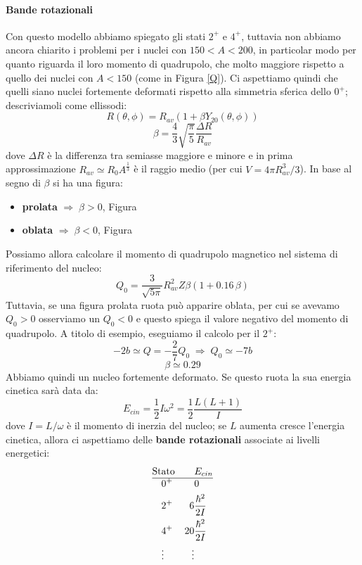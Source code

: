 \paragraph{Bande rotazionali} Con questo modello abbiamo spiegato gli stati $2^+$ e $4^+$, tuttavia non abbiamo ancora chiarito i problemi per i nuclei con $150<A<200$, in particolar modo per quanto riguarda il loro momento di quadrupolo, che molto maggiore rispetto a quello dei nuclei con $A<150$ (come in Figura \ref{Q}). Ci aspettiamo quindi che quelli siano nuclei fortemente deformati rispetto alla simmetria sferica dello $0^+$; descriviamoli come ellissodi:
$$R(\theta,\phi) = R_{av}(1+\beta Y_{20}(\theta,\phi))$$
$$\beta = \frac{4}{3}\sqrt{\frac{\pi}{5}} \frac{\Delta R}{R_{av}}$$
dove $\Delta R$ è la differenza tra semiasse maggiore e minore e in prima approssimazione $R_{av}\simeq R_0 A^{\frac{1}{3}}$ è il raggio medio (per cui $V=4\pi R_{av}^3/3$). In base al segno di $\beta$ si ha una figura:
\begin{itemize}
    \item \textbf{prolata} $\Rightarrow \; \beta >0$, Figura
    \item \textbf{oblata} $\Rightarrow \; \beta <0$, Figura
\end{itemize}
Possiamo allora calcolare il momento di quadrupolo magnetico nel sistema di riferimento del nucleo:
$$Q_0 = \frac{3}{\sqrt{5\pi}}R^2_{av}Z\beta(1+0.16\,\beta)$$
Tuttavia, se una figura prolata ruota può apparire oblata, per cui se avevamo $Q_0>0$ osserviamo un $Q_0<0$ e questo spiega il valore negativo del momento di quadrupolo. A titolo di esempio, eseguiamo il calcolo per il $2^+$:
$$-2b \simeq Q = -\frac{2}{7} Q_0 \; \Rightarrow \; Q_0 \simeq -7b$$
$$\beta \simeq 0.29$$
Abbiamo quindi un nucleo fortemente deformato. Se questo ruota la sua energia cinetica sarà data da:
$$E_{cin} = \frac{1}{2} I \omega^2=\frac{1}{2}\frac{L(L+1)}{I}$$
dove $I=L/\omega$ è il momento di inerzia del nucleo; se $L$ aumenta cresce l'energia cinetica, allora ci aspettiamo delle \textbf{bande rotazionali} associate ai livelli energetici:
\begin{displaymath}
\begin{aligned}
\text{St}&\text{ato} & &E_{cin} \\
\hline
&0^+ & &0 \\
&2^+ & 6&\frac{\hbar^2}{2I} \\
&4^+ & 20&\frac{\hbar^2}{2I} \\
&\vdots & \vdots&
\end{aligned}
\end{displaymath}
